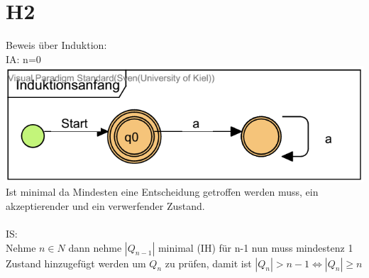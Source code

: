 \section*{H2}
Beweis über Induktion: \\
IA:
n=0\\
\includegraphics[scale=1]{part/TGIS08A02} \\
Ist minimal da Mindesten eine Entscheidung getroffen werden muss, ein akzeptierender und ein verwerfender Zustand.\\
\\
IS: \\
Nehme $n \in N$ dann nehme $|Q_{n-1}|$ minimal (IH) für n-1 nun muss mindestenz 1 Zustand hinzugefügt werden um $Q_n$ zu prüfen, damit ist $|Q_n|>n-1 \Leftrightarrow |Q_n| \geq n$
